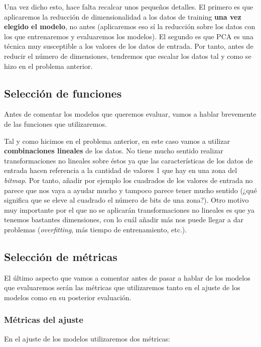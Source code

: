\documentclass[11pt,a4paper]{article}
\begin{document}
Una vez dicho esto, hace falta recalcar unos pequeños detalles. El
primero es que aplicaremos la reducción de dimensionalidad a los datos
de training \textbf{una vez elegido el modelo}, no antes (aplicaremos
eso sí la reducción sobre los datos con los que entrenaremos y
evaluaremos los modelos). El segundo es que PCA es una técnica muy
susceptible a los valores de los datos de entrada. Por tanto, antes de
reducir el número de dimensiones, tendremos que escalar los datos tal y
como se hizo en el problema anterior.

    \subsection{Selección de funciones}\label{selecciuxf3n-de-funciones}

Antes de comentar los modelos que queremos evaluar, vamos a hablar
brevemente de las funciones que utilizaremos.

Tal y como hicimos en el problema anterior, en este caso vamos a
utilizar \textbf{combinaciones lineales} de los datos. No tiene mucho
sentido realizar transformaciones no lineales sobre éstos ya que las
características de los datos de entrada hacen referencia a la cantidad
de valores 1 que hay en una zona del \emph{bitmap}. Por tanto, añadir
por ejemplo los cuadrados de los valores de entrada no parece que nos
vaya a ayudar mucho y tampoco parece tener mucho sentido (¿qué significa
que se eleve al cuadrado el número de bits de una zona?). Otro motivo
muy importante por el que no se aplicarán transformaciones no lineales
es que ya tenemos bastantes dimensiones, con lo cuál añadir más nos
puede llegar a dar problemas (\emph{overfitting}, más tiempo de
entrenamiento, etc.).

\subsection{Selección de métricas}\label{selecciuxf3n-de-muxe9tricas}

El último aspecto que vamos a comentar antes de pasar a hablar de los
modelos que evaluaremos serán las métricas que utilizaremos tanto en el
ajuste de los modelos como en su posterior evaluación.

\subsubsection{Métricas del ajuste}\label{muxe9tricas-del-ajuste}

En el ajuste de los modelos utilizaremos dos métricas:
\end{document}
